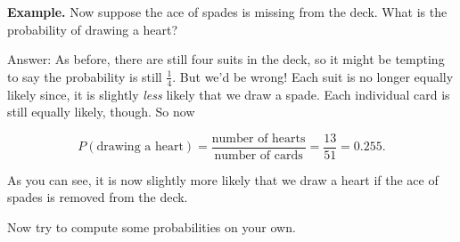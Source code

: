 \vspace{.1in}

{\bf Example.} Now suppose the ace of spades is missing from the deck. What is the probability of drawing a heart? 

\vspace{.1in}

Answer: As before, there are still four suits in the deck, so it might be tempting to say the probability is still $\frac{1}{4}$. But we'd be wrong! Each suit is no longer equally likely since, it is slightly {\it less} likely that we draw a spade. Each individual card is still equally likely, though. So now

$$ P(\mbox{drawing a heart})= \frac{\mbox{number of hearts}}{\mbox{number of cards}}=\frac{13}{51}= 0.255.$$

As you can see, it is now slightly more likely that we draw a heart if the ace of spades is removed from the deck.

Now try to compute some probabilities on your own.


